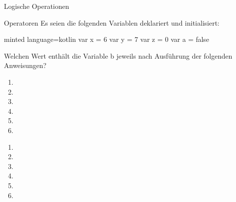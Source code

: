 \begin{task}[points=auto]{Logische Operationen }
    \begin{subtask*}[points=0]{Operatoren}
        Es seien die folgenden Variablen deklariert und initialisiert:
        \begin{codeBlock}[]{minted language=kotlin}
            var x = 6
            var y = 7
            var z = 0
            var a = false
        \end{codeBlock}
        Welchen Wert enthält die Variable b jeweils nach Ausführung der folgenden Anweisungen?
        \begin{enumerate}
            \item {}
            \item {}
            \item {}
            \item {}
            \item {}
            \item {}
        \end{enumerate}

        \begin{solution}
            \begin{multicols}{3}
                \begin{enumerate}
                    \item {}
                    \item {}
                    \item {}
                    \item {}
                    \item {}
                    \item {}
                \end{enumerate}
            \end{multicols}
        \end{solution}
    \end{subtask*}
\end{task}
